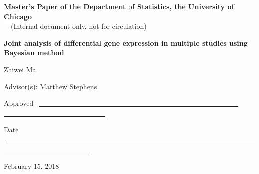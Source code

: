 \documentclass[12pt]{article}
\begin{document}
\noindent
\thispagestyle{empty}
\underline{\bf Master's Paper of the Department of Statistics, the
  University of Chicago} 
\\~~(Internal document only, not for circulation) 

\vspace{1.8in}
\begin{center}
{\bf\LARGE  Joint analysis of differential gene expression in multiple studies
using Bayesian method}


\vspace{1.4in}
{\Large Zhiwei Ma}

\vspace{1.3in}
{\Large Advisor(s): Matthew Stephens} %

\end{center}

\vspace{.6in}
{\Large Approved} ~\underline{~~~~~~~~~~~~~~~~~~~~~~~~~~~~~~~~~~~~~~~~~~~~~~~~~~~~~~~~~
~~~~~~~~~~~~~~~~~~~~~~~~~~~~~}

\vspace{.2in}
{\Large Date} ~\underline{~~~~~~~~~~~~~~~~~~~~~~~~~~~~~~~~~~~~~~~~~~~~~~~~~~~~~~~~~~~~~~~~~~~~~~~~~~~~~~~~~~~~~~~~~~~~~~~~}

\vfill
\begin{center}{\large February 15, 2018}\end{center}

\newpage
\pagestyle{plain}
\setcounter{page}{1}

\begin{abstract}

\vspace{7mm}\noindent  We introduce a new Empirical Bayes approach for jointly
analyzing differential gene expression in multiple studies or under
multiple experimental conditions. Our method searches for a small number
of latent prior distribution vectors to capture the dependence among
multiple studies. Compared with independent analysis of each study, our joint analysis approach improves both power to detect significant effects and effect-size estimation. Model fitting procedures
are implemented using expectation maximization (EM) algorithm. 
\end{abstract}

\vspace{1.5in}
\tableofcontents
\end{document}
